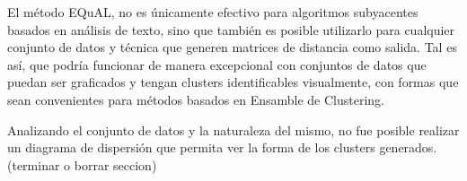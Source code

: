 \bigskip El método EQuAL, no es únicamente efectivo para algoritmos subyacentes basados en análisis de texto, sino que también es posible utilizarlo para cualquier conjunto de datos y técnica que generen matrices de distancia como salida. Tal es así, que podría funcionar de manera excepcional con conjuntos de datos que puedan ser graficados y tengan clusters identificables visualmente, con formas que sean convenientes para métodos basados en Ensamble de Clustering.


\bigskip Analizando el conjunto de datos y la naturaleza del mismo, no fue posible realizar un diagrama de dispersión que permita ver la forma de los clusters generados.
(terminar o borrar seccion)
